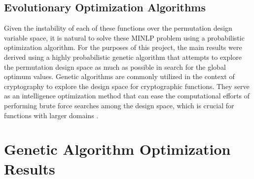 \documentclass[11pt]{article}
\begin{document}
\subsection{Evolutionary Optimization Algorithms}

Given the instability of each of these functions over the permutation design variable space, it is natural to solve these MINLP problem using a probabilistic optimization algorithm. For the purposes of this project, the main results were derived using a highly probabilistic genetic algorithm that attempts to explore the permutation design space as much as possible in search for the global optimum values. Genetic algorithms are commonly utilized in the context of cryptography to explore the design space for cryptographic functions. They serve as an intelligence optimization method that can ease the computational efforts of performing brute force searches among the design space, which is crucial for functions with larger domains \cite{Skein}.

\section{Genetic Algorithm Optimization Results}
\end{document}
